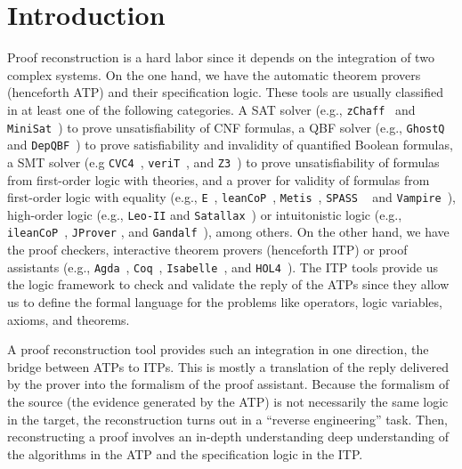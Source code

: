 \documentclass[main.tex]{subfiles}
\begin{document}

\section{Introduction}
\label{sec:introduction}

Proof reconstruction is a hard labor since it depends on the integration
of two complex systems. On the one hand, we have the automatic theorem provers
(henceforth ATP) and their specification logic. These tools are usually
classified in at least one of the following categories. A SAT solver
(e.g., \verb!zChaff!~\cite{Moskewicz2001} and \verb!MiniSat!~\cite{Een2004})
to prove unsatisfiability of CNF formulas, a QBF solver
(e.g., \verb!GhostQ!~\cite{Klieber2014} and \verb!DepQBF!~\cite{Lonsing2017})
to prove satisfiability and invalidity of quantified Boolean formulas, a SMT
solver (e.g \verb!CVC4!~\cite{Barrett2011}, \verb!veriT!~\cite{bouton2009},
and \verb!Z3!~\cite{DeMoura2008}) to prove unsatisfiability of formulas
from first-order logic with theories, and a prover for validity of
formulas from first-order logic with equality
(e.g., \verb!E!~\cite{Schulz:AICOM-2002}, \verb!leanCoP!~\cite{Otten2008},
\verb!Metis!~\cite{hurd2003first}, \verb!SPASS! ~\cite{Weidenbach2009} and
\verb!Vampire!~\cite{Riazanov1999}), high-order logic (e.g., \verb!Leo-II!
\cite{Benzmuller2008} and \verb!Satallax!~\cite{Brown2012}) or intuitonistic
logic (e.g., \verb!ileanCoP!~\cite{Otten2008}, \verb!JProver!
\cite{Schmitt2001}, and \verb!Gandalf!~\cite{Tammet1997}), among others.
On the other hand, we have the proof checkers, interactive theorem provers
(henceforth ITP) or proof assistants (e.g., \verb!Agda!~\cite{agdateam},
\verb!Coq!~\cite{coqteam}, \verb!Isabelle!~\cite{paulson1994isabelle}, and
\verb!HOL4!~\cite{norrish2007hol}).
The ITP tools provide us the logic framework to check and validate the
reply of the ATPs since they allow us to define the formal language for
the problems like operators, logic variables, axioms, and theorems.

A proof reconstruction tool provides such an integration in one direction,
the bridge between ATPs to ITPs. This is mostly a translation of the reply
delivered by the prover into the formalism of the proof assistant.
Because the formalism of the source (the evidence generated by the ATP) is
not necessarily the same logic in the target, the reconstruction turns out
in a ``reverse engineering'' task. Then, reconstructing a proof involves an
in-depth understanding deep understanding of the algorithms in the ATP and
the specification logic in the ITP.
\end{document}
